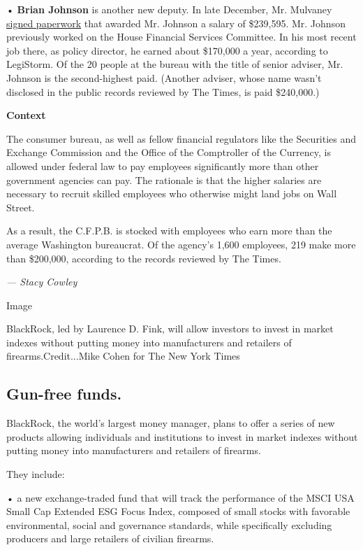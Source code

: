 • \textbf{Brian Johnson} is another new deputy. In late December, Mr.
Mulvaney
\href{https://www.documentcloud.org/documents/4430796-Johnson-Schedule-C-CFPB.html}{signed
paperwork} that awarded Mr. Johnson a salary of \$239,595. Mr. Johnson
previously worked on the House Financial Services Committee. In his most
recent job there, as policy director, he earned about \$170,000 a year,
according to LegiStorm. Of the 20 people at the bureau with the title of
senior adviser, Mr. Johnson is the second-highest paid. (Another
adviser, whose name wasn't disclosed in the public records reviewed by
The Times, is paid \$240,000.)

\textbf{Context}

The consumer bureau, as well as fellow financial regulators like the
Securities and Exchange Commission and the Office of the Comptroller of
the Currency, is allowed under federal law to pay employees
significantly more than other government agencies can pay. The rationale
is that the higher salaries are necessary to recruit skilled employees
who otherwise might land jobs on Wall Street.

As a result, the C.F.P.B. is stocked with employees who earn more than
the average Washington bureaucrat. Of the agency's 1,600 employees, 219
make more than \$200,000, according to the records reviewed by The
Times.

\emph{--- Stacy Cowley}

Image

BlackRock, led by Laurence D. Fink, will allow investors to invest in
market indexes without putting money into manufacturers and retailers of
firearms.Credit...Mike Cohen for The New York Times

\hypertarget{gun-free-funds}{%
\subsection{Gun-free funds.}\label{gun-free-funds}}

BlackRock, the world's largest money manager, plans to offer a series of
new products allowing individuals and institutions to invest in market
indexes without putting money into manufacturers and retailers of
firearms.

They include:

• a new exchange-traded fund that will track the performance of the MSCI
USA Small Cap Extended ESG Focus Index, composed of small stocks with
favorable environmental, social and governance standards, while
specifically excluding producers and large retailers of civilian
firearms.

